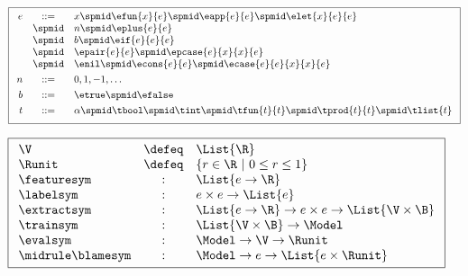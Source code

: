 \begin{figure}
\small
\centering
\begin{minipage}[c]{.4\textwidth}
\[
\boxed{
\begin{array}{rcl}
e & ::=    & x \spmid \efun{x}{e} \spmid \eapp{e}{e} \spmid \elet{x}{e}{e} \\
  & \spmid & n \spmid \eplus{e}{e}\\
  & \spmid & b \spmid \eif{e}{e}{e} \\
  & \spmid & \epair{e}{e} \spmid \epcase{e}{x}{x}{e} \\
  & \spmid & \enil \spmid \econs{e}{e} \spmid \ecase{e}{e}{x}{x}{e} \\[0.05in]

n & ::= &  0, 1, -1, \ldots \\[0.05in]

b & ::= &  \etrue \spmid \efalse \\[0.05in]

t & ::= & \alpha \spmid \tbool \spmid \tint \spmid \tfun{t}{t} \spmid \tprod{t}{t} \spmid \tlist{t} \\[0.05in]
\end{array}
}
\]
\label{fig:syntax}
\end{minipage}
\hfill
\begin{minipage}[c]{.45\textwidth}
\lstDeleteShortInline{|} %
\[
\boxed{
\begin{array}{lcl}
  \V          & \defeq & \List{\R}\\
  \Runit      & \defeq & \{r \in \R\ |\ 0 \le r \le 1\} \\ %
  \featuresym & : & \List{e \to \R} \\
  \labelsym   & : & e \times e \to \List{e} \\
  \extractsym & : & \List{e \to \R} \to e \times e \to \List{\V \times \B} \\
  \trainsym   & : & \List{\V \times \B} \to \Model \\
  \evalsym    & : & \Model \to \V \to \Runit \\
  \midrule
  \blamesym   & : & \Model \to e \to \List{e \times \Runit}
\end{array}
}
\]
\lstMakeShortInline{|}
\label{fig:api}
\end{minipage}
\end{figure}
